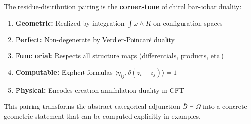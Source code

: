 \begin{conclusion}
The residue-distribution pairing is the \textbf{cornerstone} of chiral bar-cobar duality:

\begin{enumerate}
\item \textbf{Geometric:} Realized by integration $\int \omega \wedge K$ on configuration spaces

\item \textbf{Perfect:} Non-degenerate by Verdier-Poincaré duality

\item \textbf{Functorial:} Respects all structure maps (differentials, products, etc.)

\item \textbf{Computable:} Explicit formulas $\langle \eta_{ij}, \delta(z_i-z_j) \rangle = 1$

\item \textbf{Physical:} Encodes creation-annihilation duality in CFT
\end{enumerate}

This pairing transforms the abstract categorical adjunction $\bar{B} \dashv \Omega$ into
a concrete geometric statement that can be computed explicitly in examples.
\end{conclusion}

